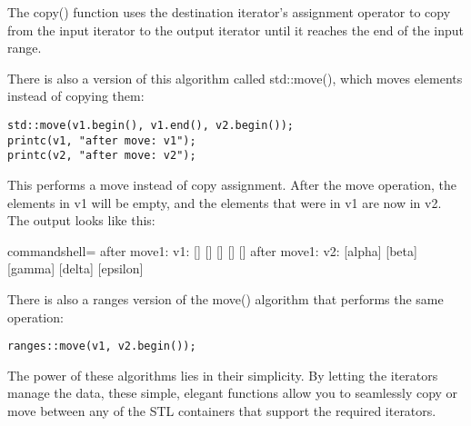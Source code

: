 The copy() function uses the destination iterator's assignment operator to copy from the input iterator to the output iterator until it reaches the end of the input range.

There is also a version of this algorithm called std::move(), which moves elements instead of copying them:

\begin{lstlisting}[style=styleCXX]
std::move(v1.begin(), v1.end(), v2.begin());
printc(v1, "after move: v1");
printc(v2, "after move: v2");
\end{lstlisting}

This performs a move instead of copy assignment. After the move operation, the elements in v1 will be empty, and the elements that were in v1 are now in v2. The output looks like this:

\begin{tcblisting}{commandshell={}}
after move1: v1: [] [] [] [] []
after move1: v2: [alpha] [beta] [gamma] [delta] [epsilon]
\end{tcblisting}

There is also a ranges version of the move() algorithm that performs the same operation:

\begin{lstlisting}[style=styleCXX]
ranges::move(v1, v2.begin());
\end{lstlisting}

The power of these algorithms lies in their simplicity. By letting the iterators manage the data, these simple, elegant functions allow you to seamlessly copy or move between any of the STL containers that support the required iterators.








